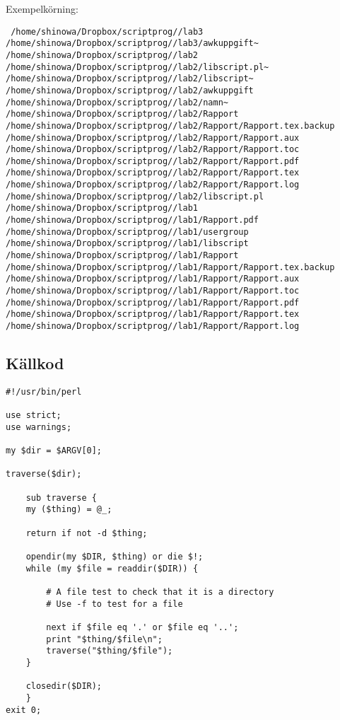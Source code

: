 \documentclass[11pt, titlepage, oneside, a4paper]{article}
\newcommand{\Subsection}[1]{\vspace{-4pt}\subsection{#1}\vspace{-8pt}}
\begin{document}
Exempelkörning:
\begin{verbatim}
 /home/shinowa/Dropbox/scriptprog//lab3
/home/shinowa/Dropbox/scriptprog//lab3/awkuppgift~
/home/shinowa/Dropbox/scriptprog//lab2
/home/shinowa/Dropbox/scriptprog//lab2/libscript.pl~
/home/shinowa/Dropbox/scriptprog//lab2/libscript~
/home/shinowa/Dropbox/scriptprog//lab2/awkuppgift
/home/shinowa/Dropbox/scriptprog//lab2/namn~
/home/shinowa/Dropbox/scriptprog//lab2/Rapport
/home/shinowa/Dropbox/scriptprog//lab2/Rapport/Rapport.tex.backup
/home/shinowa/Dropbox/scriptprog//lab2/Rapport/Rapport.aux
/home/shinowa/Dropbox/scriptprog//lab2/Rapport/Rapport.toc
/home/shinowa/Dropbox/scriptprog//lab2/Rapport/Rapport.pdf
/home/shinowa/Dropbox/scriptprog//lab2/Rapport/Rapport.tex
/home/shinowa/Dropbox/scriptprog//lab2/Rapport/Rapport.log
/home/shinowa/Dropbox/scriptprog//lab2/libscript.pl
/home/shinowa/Dropbox/scriptprog//lab1
/home/shinowa/Dropbox/scriptprog//lab1/Rapport.pdf
/home/shinowa/Dropbox/scriptprog//lab1/usergroup
/home/shinowa/Dropbox/scriptprog//lab1/libscript
/home/shinowa/Dropbox/scriptprog//lab1/Rapport
/home/shinowa/Dropbox/scriptprog//lab1/Rapport/Rapport.tex.backup
/home/shinowa/Dropbox/scriptprog//lab1/Rapport/Rapport.aux
/home/shinowa/Dropbox/scriptprog//lab1/Rapport/Rapport.toc
/home/shinowa/Dropbox/scriptprog//lab1/Rapport/Rapport.pdf
/home/shinowa/Dropbox/scriptprog//lab1/Rapport/Rapport.tex
/home/shinowa/Dropbox/scriptprog//lab1/Rapport/Rapport.log
\end{verbatim}

	
	
	
	\Subsection{Källkod}
	\begin{lstlisting}
#!/usr/bin/perl

use strict;
use warnings;

my $dir = $ARGV[0];

traverse($dir);    
    
    sub traverse {
	my ($thing) = @_;

	return if not -d $thing;
	
	opendir(my $DIR, $thing) or die $!;    
	while (my $file = readdir($DIR)) {
	
	    # A file test to check that it is a directory
	    # Use -f to test for a file
	    
	    next if $file eq '.' or $file eq '..';
	    print "$thing/$file\n";
	    traverse("$thing/$file");
	}

	closedir($DIR);
    }
exit 0;
	\end{lstlisting}

	
		
\end{document}
